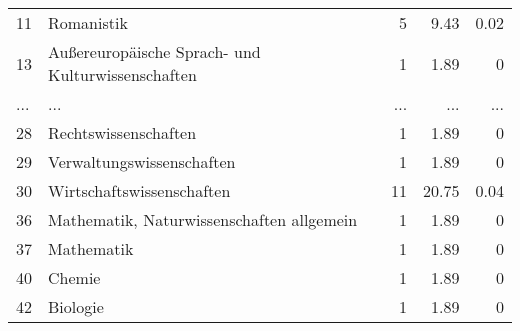 \begin{longtable}{lXrrr}
        11 & \multicolumn{1}{X}{Romanistik} & %
          \num{5} &
          \num[round-mode=places,round-precision=2]{9.43} &
          \num[round-mode=places,round-precision=2]{0.02} \\
        13 & \multicolumn{1}{X}{Außereuropäische Sprach- und Kulturwissenschaften} & %
          \num{1} &
          \num[round-mode=places,round-precision=2]{1.89} &
          \num[round-mode=places,round-precision=2]{0} \\
       ... & ... & ... & ... & ... \\
        28 & \multicolumn{1}{X}{Rechtswissenschaften} & %
          \num{1} &
          \num[round-mode=places,round-precision=2]{1.89} &
          \num[round-mode=places,round-precision=2]{0} \\

        29 & \multicolumn{1}{X}{Verwaltungswissenschaften} & %
          \num{1} &
          \num[round-mode=places,round-precision=2]{1.89} &
          \num[round-mode=places,round-precision=2]{0} \\

        30 & \multicolumn{1}{X}{Wirtschaftswissenschaften} & %
          \num{11} &
          \num[round-mode=places,round-precision=2]{20.75} &
          \num[round-mode=places,round-precision=2]{0.04} \\

        36 & \multicolumn{1}{X}{Mathematik, Naturwissenschaften allgemein} & %
          \num{1} &
          \num[round-mode=places,round-precision=2]{1.89} &
          \num[round-mode=places,round-precision=2]{0} \\

        37 & \multicolumn{1}{X}{Mathematik} & %
          \num{1} &
          \num[round-mode=places,round-precision=2]{1.89} &
          \num[round-mode=places,round-precision=2]{0} \\

        40 & \multicolumn{1}{X}{Chemie} & %
          \num{1} &
          \num[round-mode=places,round-precision=2]{1.89} &
          \num[round-mode=places,round-precision=2]{0} \\

        42 & \multicolumn{1}{X}{Biologie} & %
          \num{1} &
          \num[round-mode=places,round-precision=2]{1.89} &
          \num[round-mode=places,round-precision=2]{0} \\


\end{longtable}
